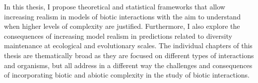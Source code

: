 \documentclass[12pt]{article}
\begin{document}

In this thesis, I propose theoretical and statistical frameworks that allow increasing realism in models of biotic interactions with the aim to understand when higher levels of complexity are justified. Furthermore, I also explore the consequences of increasing model realism in predictions related to diversity maintenance at ecological and evolutionary scales. The individual chapters of this thesis are thematically broad as they are focused on different types of interactions and organisms, but all address in a different way the challenges and consequences of incorporating biotic and abiotic complexity in the study of biotic interactions.





\clearpage


\end{document}
